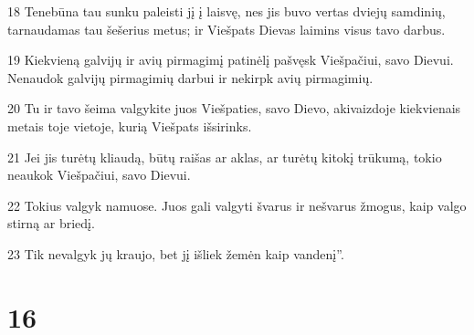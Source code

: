\par 18 Tenebūna tau sunku paleisti jį į laisvę, nes jis buvo vertas dviejų samdinių, tarnaudamas tau šešerius metus; ir Viešpats Dievas laimins visus tavo darbus. 
\par 19 Kiekvieną galvijų ir avių pirmagimį patinėlį pašvęsk Viešpačiui, savo Dievui. Nenaudok galvijų pirmagimių darbui ir nekirpk avių pirmagimių. 
\par 20 Tu ir tavo šeima valgykite juos Viešpaties, savo Dievo, akivaizdoje kiekvienais metais toje vietoje, kurią Viešpats išsirinks. 
\par 21 Jei jis turėtų kliaudą, būtų raišas ar aklas, ar turėtų kitokį trūkumą, tokio neaukok Viešpačiui, savo Dievui. 
\par 22 Tokius valgyk namuose. Juos gali valgyti švarus ir nešvarus žmogus, kaip valgo stirną ar briedį. 
\par 23 Tik nevalgyk jų kraujo, bet jį išliek žemėn kaip vandenį”.



\chapter{16}

